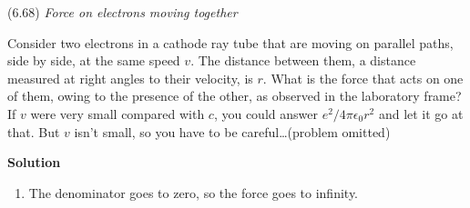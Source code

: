 \documentclass{article}
\begin{document}
\begin{homeworkProblem}
	(6.68) \textit{Force on electrons moving together}
	
	Consider two electrons in a cathode ray tube that are moving on parallel paths, side by side, at the same speed $v$. The distance between them, a distance measured at right angles to their velocity, is $r$. What is the force that acts on one of them, owing to the presence of the other, as observed in the laboratory frame? If $v$ were very small compared with $c$, you could answer $e^2/4\pi\epsilon_0r^2$ and let it go at that. But $v$ isn't small, so you have to be careful\ldots (problem omitted)

	\textbf{Solution}
	\begin{enumerate}[label = (\alph*)]
		\begin{item}
			The first idea to do this would be to look at the system in the $F$ frame where the electrons are stationary, whose $\gamma=\frac{1}{\sqrt{1-v^2/c^2}}$. Then $E=e^2/4\pi\epsilon_0r^2$, since $r$ is perpendicular to the direction of relative motion and does not change. Therefore using the transformation between the frames
			\[
				{F_\perp}'=\gamma F_\perp=\frac{e^2}{\gamma4\pi\epsilon_0r^2}=\frac{e^2}{4\sqrt{1-v^2/c^2}\pi\epsilon_0r^2}
			\]
			pointing downward.
		\end{item}
		\begin{item}
			So the field of the moving charge is
			\[
				E'=\frac{e}{4\pi\epsilon_0{r'}^2}\frac{1-\beta^2}{{\left(1-\beta^2\sin^2\theta'\right)}^{3/2}}
			\]
			For the charge $e$ at each instance when they are always at $\theta'=\pi/2$, the force downwards is
			\[
				F'=\frac{e^2}{4\pi\epsilon_0r^2}\frac{1}{{\left(1-\beta^2\right)}^{1/2}}=\frac{e^2}{\gamma4\pi\epsilon_0r^2}=\frac{e^2}{4\sqrt{1-v^2/c^2}\pi\epsilon_0r^2}
			\]
			Magnetic field
			\[
				{B_\perp}'=-\gamma\frac{v}{c^2}E_\perp
			\]
			\[
				{F_B}'=qv\times{B_\perp}'=qv\gamma\frac{v}{c^2}E_\perp
			\]
			which is pointing upward. The net force
			\[
				F_\mathrm{net}=eE_\perp/\gamma
			\]
		\end{item}
		\item The denominator goes to zero, so the force goes to infinity.
	\end{enumerate}
\end{homeworkProblem}

\end{document}
